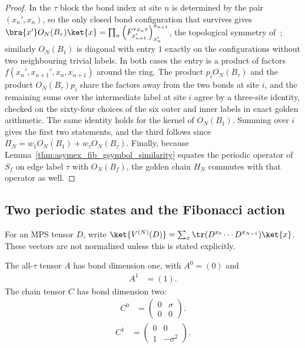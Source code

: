 \begin{proof}
    \leanok
    In the $\tau$ block the bond index at site $n$ is determined by the
    pair $(x_n',x_n)$, so the only closed bond configuration that survives
    gives
    $\bra{x'}O_N(B_\tau)\ket{x}=\prod_n
        \left(F^{\tau x_n\tau}_{x_{n+1}'}\right)_{x_n'}^{x_{n+1}}$,
    the topological symmetry of~\cite{Feiguin2007GoldenChain}; similarly
    $O_N(B_1)$ is diagonal with entry $1$ exactly on the configurations
    without two neighbouring trivial labels. In both cases the entry is a
    product of factors $f(x_n',x_{n+1}',x_n,x_{n+1})$ around the ring. The
    product $p_iO_N(B_\tau)$ and the product $O_N(B_\tau)p_i$ share the
    factors away from the two bonds at site $i$, and the remaining sums
    over the intermediate label at site $i$ agree by a three-site identity,
    checked on the sixty-four choices of the six outer and inner labels in
    exact golden arithmetic. The same identity holds for the kernel of
    $O_N(B_1)$. Summing over $i$ gives the first two statements, and the
    third follows since $\Pi_N=w_1O_N(B_1)+w_\tau O_N(B_\tau)$. Finally,
    because Lemma~\ref{thm:asymex_fib_gsymbol_similarity} equates the
    periodic operator of $S_f$ on edge label $\tau$ with $O_N(B_f)$, the
    golden chain $H_N$ commutes with that operator as well.
\end{proof}

\subsection{Two periodic states and the Fibonacci action}

For an MPS tensor $D$, write
$\ket{V^{(N)}(D)}=\sum_x\tr(D^{x_0}\cdots D^{x_{N-1}})\ket{x}$.
These vectors are not normalized unless this is stated explicitly.

\begin{definition}
    \label{def:asymex_fib_states}
    \leanok
    The all-$\tau$ tensor $A$ has bond dimension one, with
    $A^0=(0)$ and
    \begin{align}
        A^1 & =(1).
        \label{eq:asymex_fib_product_tensor}
    \end{align}
    The chain tensor $C$ has bond dimension two:
    \begin{align}
        C^0 & =\begin{pmatrix}0&\sigma\\0&0\end{pmatrix}.
        \label{eq:asymex_fib_chain_zero}
    \end{align}
    \begin{align}
        C^1 & =\begin{pmatrix}0&0\\1&-\sigma^2\end{pmatrix}.
        \label{eq:asymex_fib_chain_one}
    \end{align}
\end{definition}

